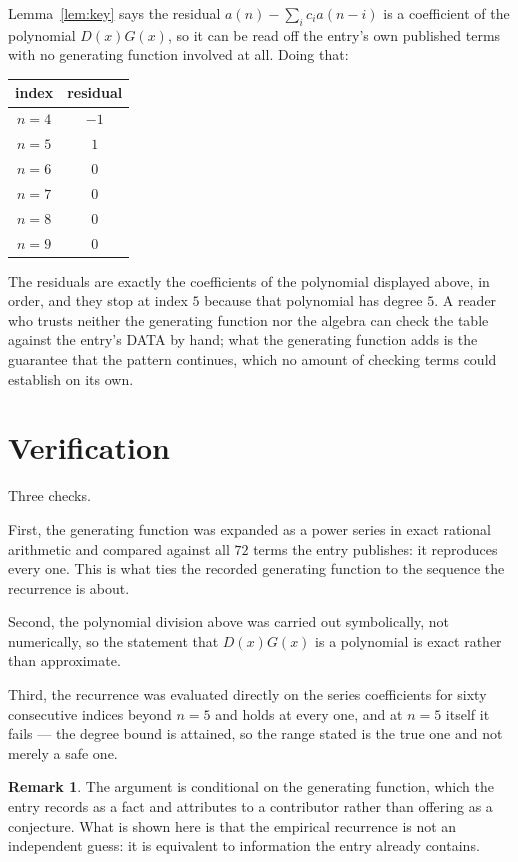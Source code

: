 \documentclass[11pt,a4paper]{article}
\theoremstyle{plain}
\theoremstyle{definition}
\newtheorem{remark}[theorem]{Remark}
\begin{document}
Lemma~\ref{lem:key} says the residual $a(n)-\sum_ic_ia(n-i)$ is a coefficient of the
polynomial $D(x)G(x)$, so it can be read off the entry's own published terms with no
generating function involved at all. Doing that:
\begin{center}
\begin{tabular}{cc}
index & residual \\ \hline
$n=4$ & $-1$ \\
$n=5$ & $1$ \\
$n=6$ & $0$ \\
$n=7$ & $0$ \\
$n=8$ & $0$ \\
$n=9$ & $0$
\end{tabular}
\end{center}
The residuals are exactly the coefficients of the polynomial displayed above, in order, and
they stop at index $5$ because that polynomial has degree $5$. A reader who trusts
neither the generating function nor the algebra can check the table against the entry's DATA
by hand; what the generating function adds is the guarantee that the pattern continues, which
no amount of checking terms could establish on its own.

\section{Verification}

Three checks.

First, the generating function was expanded as a power series in exact rational arithmetic and
compared against all $72$ terms the entry publishes: it reproduces every one. This is
what ties the recorded generating function to the sequence the recurrence is about.

Second, the polynomial division above was carried out symbolically, not numerically, so the
statement that $D(x)G(x)$ is a polynomial is exact rather than approximate.

Third, the recurrence was evaluated directly on the series coefficients for sixty consecutive
indices beyond $n=5$ and holds at every one, and at $n=5$ itself it fails --- the
degree bound is attained, so the range stated is the true one and not merely a safe one.

\begin{remark}
The argument is conditional on the generating function, which the entry records as a fact and
attributes to a contributor rather than offering as a conjecture. What is shown here is that
the empirical recurrence is not an independent guess: it is equivalent to information the
entry already contains.
\end{remark}
\end{document}
